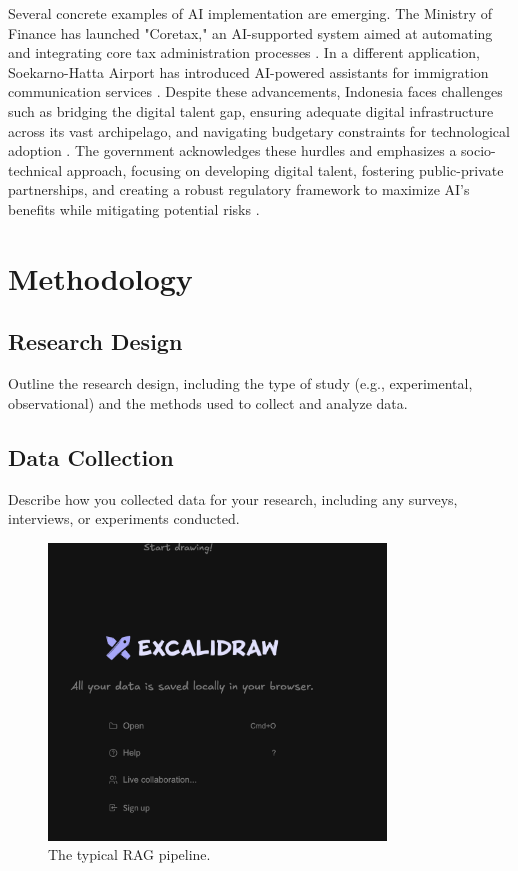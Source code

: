 \documentclass[12pt]{report}
\begin{document}
\begin{itemize}
    Several concrete examples of AI implementation are emerging. The Ministry of Finance has launched "Coretax," an AI-supported system aimed at automating and integrating core tax administration processes \cite{dipstrategy_fenomena_penerapan_ai}. In a different application, Soekarno-Hatta Airport has introduced AI-powered assistants for immigration communication services \cite{dipstrategy_fenomena_penerapan_ai}. Despite these advancements, Indonesia faces challenges such as bridging the digital talent gap, ensuring adequate digital infrastructure across its vast archipelago, and navigating budgetary constraints for technological adoption \cite{govinsider_navigating_ai_2025, mfat_indonesia_ai_strategy_2023}. The government acknowledges these hurdles and emphasizes a socio-technical approach, focusing on developing digital talent, fostering public-private partnerships, and creating a robust regulatory framework to maximize AI's benefits while mitigating potential risks \cite{govinsider_navigating_ai_2025, opengovasia_indonesia_ai_strategy_2025}.


    
\end{itemize}

\newpage

\chapter{Methodology}
\section{Research Design}
Outline the research design, including the type of study (e.g., experimental, observational) and the methods used to collect and analyze data.
\section{Data Collection}
Describe how you collected data for your research, including any surveys, interviews, or experiments conducted.
\begin{figure}
    \centering
    \includegraphics[width=0.8\textwidth]{images/1/apa-ini.png}
    \caption{The typical RAG pipeline.}
    \label{fig:example2}
\end{figure}
\end{document}
